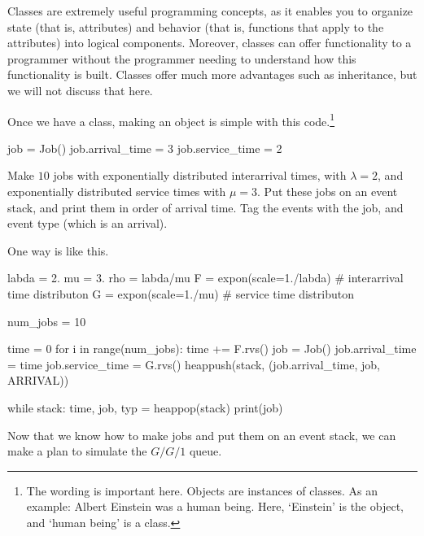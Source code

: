 \documentclass{scrartcl}
\begin{document}
Classes are extremely useful programming concepts, as it enables you to organize state (that is, attributes) and behavior (that is, functions that apply to the attributes) into logical components. Moreover, classes can offer functionality to a programmer without the programmer needing to understand how this functionality is built. Classes offer much more advantages such as inheritance, but we will not discuss that here. 

Once we have a class, making an object is simple with this code.\footnote{The wording is important here. Objects are instances of classes. As an example: Albert Einstein was a human being. Here, `Einstein' is the object, and `human being' is a class.}

\begin{pyblock}
job = Job()
job.arrival_time = 3
job.service_time = 2
\end{pyblock}

\begin{exercise}\label{ex:3}
  Make $10$ jobs with exponentially distributed interarrival times, with $\lambda=2$,  and exponentially distributed service times with $\mu=3$. Put these jobs on an event stack, and print them in order of arrival time. Tag the events with the job, and event type (which is an arrival).
  \begin{solution}
One way is like this.     
    \begin{pyblock}
labda = 2.
mu = 3.
rho = labda/mu
F = expon(scale=1./labda)  # interarrival time distributon
G = expon(scale=1./mu)  # service time distributon

num_jobs = 10

time = 0
for i in range(num_jobs):
    time += F.rvs()
    job = Job()
    job.arrival_time = time
    job.service_time = G.rvs()
    heappush(stack, (job.arrival_time, job, ARRIVAL))


while stack:
    time, job, typ = heappop(stack)
    print(job)
    
    \end{pyblock}
  \end{solution}
\end{exercise}

Now that we know how to make jobs and put them on an event stack, we can make a plan to simulate the $G/G/1$ queue. 
\end{document}

